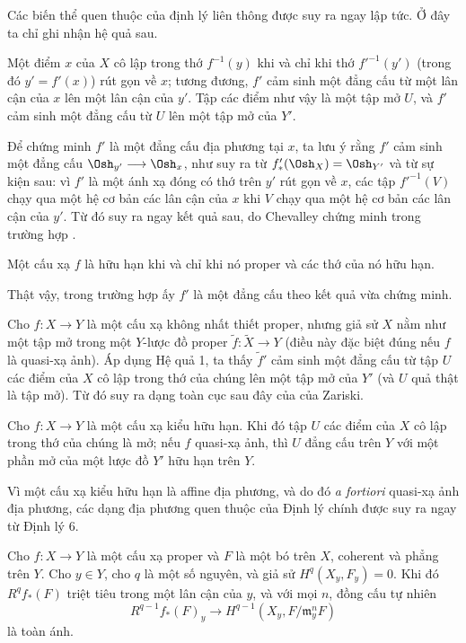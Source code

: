 Các biến thể quen thuộc của định lý liên thông được suy ra ngay lập tức. Ở đây
ta chỉ ghi nhận hệ quả sau.

 Một điểm $x$ của $X$ cô lập trong thớ $f^{-1}(y)$ khi và
chỉ khi thớ $f'^{-1}(y')$ (trong đó $y'=f'(x)$) rút gọn về $x$; tương đương,
$f'$ cảm sinh một đẳng cấu từ một lân cận của $x$ lên một lân cận của $y'$.
Tập các điểm như vậy là một tập mở $U$, và $f'$ cảm sinh một đẳng cấu từ $U$
lên một tập mở của $Y'$.

Để chứng minh $f'$ là một đẳng cấu địa phương tại $x$, ta lưu ý rằng $f'$ cảm
sinh một đẳng cấu $\Osh_{y'}\longrightarrow\Osh_x$, như suy ra từ
$f'_*(\Osh_X)=\Osh_{Y'}$ và từ sự kiện sau: vì $f'$ là một ánh xạ đóng có thớ
trên $y'$ rút gọn về $x$, các tập $f'^{-1}(V)$ chạy qua một hệ cơ bản các lân
cận của $x$ khi $V$ chạy qua một hệ cơ bản các lân cận của $y'$. Từ đó suy ra
ngay kết quả sau, do Chevalley chứng minh trong trường hợp
.

 Một cấu xạ $f$ là hữu hạn khi và chỉ khi nó proper và các
thớ của nó hữu hạn.

Thật vậy, trong trường hợp ấy $f'$ là một đẳng cấu theo kết quả vừa chứng minh.

Cho $f:X\longrightarrow Y$ là một cấu xạ không nhất thiết proper, nhưng giả sử
$X$ nằm như một tập mở trong một $Y$-lược đồ proper
$\widetilde f:\widetilde X\longrightarrow Y$ (điều này đặc biệt đúng nếu $f$
là quasi-xạ ảnh). Áp dụng Hệ quả 1, ta thấy $\widetilde f'$ cảm sinh một đẳng
cấu từ tập $U$ các điểm của $X$ cô lập trong thớ của chúng lên một tập mở của
$Y'$ (và $U$ quả thật là tập mở). Từ đó suy ra dạng toàn cục sau đây của
 của Zariski.

 Cho
$f:X\longrightarrow Y$ là một cấu xạ kiểu hữu hạn. Khi đó tập $U$ các điểm
của $X$ cô lập trong thớ của chúng là mở; nếu $f$ quasi-xạ ảnh, thì $U$ đẳng
cấu trên $Y$ với một phần mở của một lược đồ $Y'$ hữu hạn trên $Y$.

Vì một cấu xạ kiểu hữu hạn là affine địa phương, và do đó \textit{a fortiori}
quasi-xạ ảnh địa phương, các dạng địa phương quen thuộc của Định lý chính được
suy ra ngay từ Định lý 6.

 Cho $f:X\longrightarrow Y$ là một cấu xạ proper và $F$
là một bó trên $X$, coherent và phẳng trên $Y$. Cho $y\in Y$, cho $q$ là một
số nguyên, và giả sử $H^q(X_y,F_y)=0$. Khi đó $R^qf_*(F)$ triệt tiêu trong một
lân cận của $y$, và với mọi $n$, đồng cấu tự nhiên
\[
  R^{q-1}f_*(F)_y\longrightarrow
  H^{q-1}(X_y,F/\mathfrak m_y^nF)
\]
là toàn ánh.

